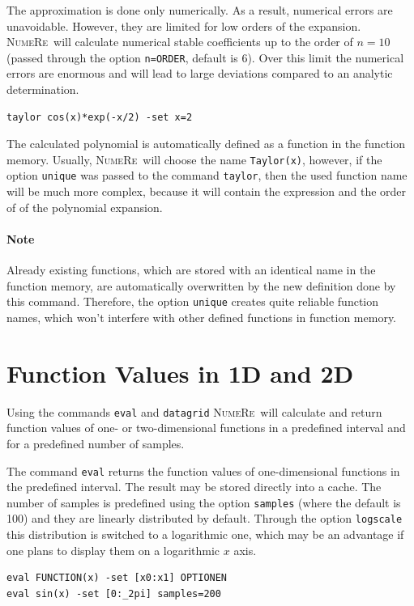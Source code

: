 \documentclass[DIV=14,headsepline,footsepline]{scrbook}
\newcommand{\NR}{\textsc{Nu\-me\-Re}}
\begin{document}
				The approximation is done only numerically. As a result, numerical errors are unavoidable. However, they are limited for low orders of the expansion. \NR\ will calculate numerical stable coefficients up to the order of $n = 10$ (passed through the option \verb+n=ORDER+, default is 6). Over this limit the numerical errors are enormous and will lead to large deviations compared to an analytic determination.
				\begin{lstlisting}
taylor cos(x)*exp(-x/2) -set x=2
				\end{lstlisting}
				
				The calculated polynomial is automatically defined as a function in the function memory. Usually, \NR\ will choose the name \verb+Taylor(x)+, however, if the option \verb+unique+ was passed to the command \verb+taylor+, then the used function name will be much more complex, because it will contain the expression and the order of of the polynomial expansion.
				\paragraph{Note} Already existing functions, which are stored with an identical name in the function memory, are automatically overwritten by the new definition done by this command. Therefore, the option \verb+unique+ creates quite reliable function names, which won't interfere with other defined functions in function memory.
				
			\section{Function Values in 1D and 2D} %
				Using the commands \verb+eval+ and \verb+datagrid+ \NR\ will calculate and return function values of one- or two-dimensional functions in a predefined interval and for a predefined number of samples.
				
				The command \verb+eval+ returns the function values of one-dimensional functions in the predefined interval. The result may be stored directly into a cache. The number of samples is predefined using the option \verb+samples+ (where the default is 100) and they are linearly distributed by default. Through the option \verb+logscale+ this distribution is switched to a logarithmic one, which may be an advantage if one plans to display them on a logarithmic $x$ axis.
				\begin{lstlisting}
eval FUNCTION(x) -set [x0:x1] OPTIONEN
eval sin(x) -set [0:_2pi] samples=200
				\end{lstlisting}
				
\end{document}

